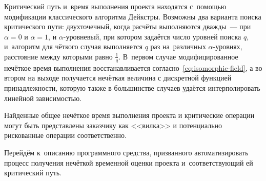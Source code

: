 Критический путь и~время выполнения проекта находятся с~помощью модификации классического алгоритма Дейкстры. Возможны два варианта поиска критического пути: двухточечный, когда расчёты выполняются дважды~--- при $\alpha=0$ и $\alpha=1$, и $\alpha$-уровневый, при котором задаётся число уровней поиска $q$, и~алгоритм для чёткого случая выполняется $q$ раз на~различных $\alpha$-уровнях, расстояние между которыми равно $\displaystyle \frac{1}{q}$. В~первом случае модифицированное нечёткое время выполнения восстанавливается согласно~\eqref{eq:isomorphic-field}, а во втором на выходе получается нечёткая величина с дискретной функцией принадлежности, которую также в большинстве случаев удаётся интерполировать линейной зависимостью.

Найденные общее нечёткое время выполнения проекта и критические операции могут быть представлены заказчику как <<вилка>> и потенциально рискованные операции соответственно.

Перейдём к~описанию программного средства, призванного автоматизировать процесс получения нечёткой временной оценки проекта и~соответствующий ей критический путь.
